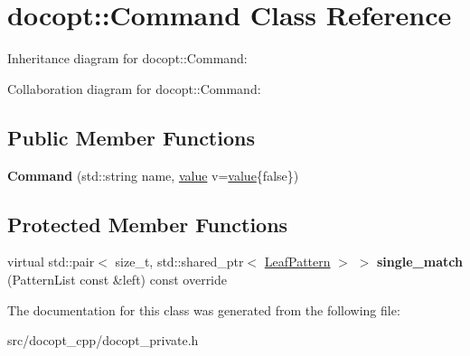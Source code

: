 \hypertarget{classdocopt_1_1Command}{}\section{docopt\+:\+:Command Class Reference}
\label{classdocopt_1_1Command}


Inheritance diagram for docopt\+:\+:Command\+:


Collaboration diagram for docopt\+:\+:Command\+:
\subsection*{Public Member Functions}
\begin{DoxyCompactItemize}
\item 
\mbox{\label{classdocopt_1_1Command_a94e1480a83f75acf6c1e7d506253c319}} 
{\bfseries Command} (std\+::string name, \hyperlink{structdocopt_1_1value}{value} v=\hyperlink{structdocopt_1_1value}{value}\{false\})
\end{DoxyCompactItemize}
\subsection*{Protected Member Functions}
\begin{DoxyCompactItemize}
\item 
\mbox{\label{classdocopt_1_1Command_a914bd0c3225c4e14ed55bacb873ca87f}} 
virtual std\+::pair$<$ size\+\_\+t, std\+::shared\+\_\+ptr$<$ \hyperlink{classdocopt_1_1LeafPattern}{Leaf\+Pattern} $>$ $>$ {\bfseries single\+\_\+match} (Pattern\+List const \&left) const override
\end{DoxyCompactItemize}


The documentation for this class was generated from the following file\+:\begin{DoxyCompactItemize}
\item 
src/docopt\+\_\+cpp/docopt\+\_\+private.\+h\end{DoxyCompactItemize}
